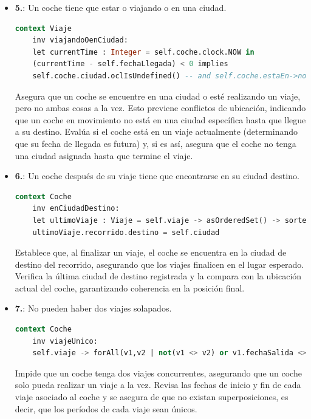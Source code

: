 \documentclass[12pt.a4paper]{article}
\begin{document}
\begin{itemize}
    \item \textbf{5.}: Un coche tiene que estar o viajando o en una ciudad.
    \begin{lstlisting}[style = useEspecifico,language=SQL]
  context Viaje
    inv viajandoOenCiudad:
    let currentTime : Integer = self.coche.clock.NOW in
    (currentTime - self.fechaLlegada) < 0 implies
    self.coche.ciudad.oclIsUndefined() -- and self.coche.estaEn->notEmpty()
    \end{lstlisting}
    Asegura que un coche se encuentre en una ciudad o esté realizando un viaje, pero no ambas cosas a la vez. Esto previene conflictos de ubicación, indicando que un coche en movimiento no está en una ciudad específica hasta que llegue a su destino.
    Evalúa si el coche está en un viaje actualmente (determinando que su fecha de llegada es futura) y, si es así, asegura que el coche no tenga una ciudad asignada hasta que termine el viaje.
    
    \item \textbf{6.}: Un coche después de su viaje tiene que encontrarse en su ciudad destino.
    \begin{lstlisting}[style = useEspecifico,language=SQL]
  context Coche
    inv enCiudadDestino:
    let ultimoViaje : Viaje = self.viaje -> asOrderedSet() -> sortedBy(fechaLlegada) -> last() in
    ultimoViaje.recorrido.destino = self.ciudad
    \end{lstlisting}
    Establece que, al finalizar un viaje, el coche se encuentra en la ciudad de destino del recorrido, asegurando que los viajes finalicen en el lugar esperado.
    Verifica la última ciudad de destino registrada y la compara con la ubicación actual del coche, garantizando coherencia en la posición final.
    
    \item \textbf{7.}: No pueden haber dos viajes solapados.
    \begin{lstlisting}[style = useEspecifico,language=SQL]
  context Coche
    inv viajeUnico:
    self.viaje -> forAll(v1,v2 | not(v1 <> v2) or v1.fechaSalida <> v2.fechaSalida and (v1.fechaLlegada <= v2.fechaSalida or v2.fechaLlegada <= v1.fechaSalida))
    \end{lstlisting}
    Impide que un coche tenga dos viajes concurrentes, asegurando que un coche solo pueda realizar un viaje a la vez.
    Revisa las fechas de inicio y fin de cada viaje asociado al coche y se asegura de que no existan superposiciones, es decir, que los períodos de cada viaje sean únicos.
    

\end{itemize}
\end{document}
